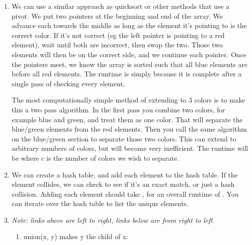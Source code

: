 \documentclass[12pt]{chmullighw}
\begin{document}
\begin{enumerate}
\item We can use a similar approach as quicksort or other methods that use a pivot. We put two pointers at the beginning and end of the array. We advance each towards the middle as long as the element it's pointing to is the correct color. If it's not correct (eg the left pointer is pointing to a red element), wait until both are incorrect, then swap the two. Those two elements will then be on the correct side, and we continue each pointer. Once the pointers meet, we know the array is sorted such that all blue elements are before all red elements. The runtime is simply  because it is complete after a single pass of checking every element.

The most computationally simple method of extending to 3 colors is to make this a two pass algorithm. In the first pass you combine two colors, for example blue and green, and treat them as one color. That will separate the blue/green elements from the red elements. Then you call the same algorithm on the blue/green section to separate those two colors. This can extend to arbitrary numbers of colors, but will become very inefficient. The runtime will be  where $c$ is the number of colors we wish to separate.


\item We can create a hash table, and add each element to the hash table. If the element collides, we can check to see if it's an exact match, or just a hash collision. Adding each element should take , for an overall runtime of . You can iterate over the hash table to list the unique elements.

\item {\em Note: links above are left to right, links below are from right to left}

\begin{enumerate} \renewcommand{\labelenumii}{\alph{enumii}.}
    \item union(x, y) makes y the child of x:

\end{enumerate}
\end{enumerate}
\end{document}
